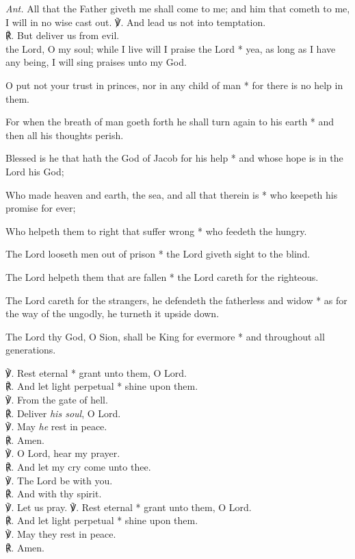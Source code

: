\textit{Ant.} All that the Father giveth me shall come to me; and him that cometh to me, I will in no wise cast out.
℣. And lead us not into temptation.\\
℟. But deliver us from evil.\\
 the Lord, O my soul; while I live will I praise the Lord * yea, as long as I have any being, I will sing praises unto my God.
\par
O put not your trust in princes, nor in any child of man * for there is no help in them.
\par
For when the breath of man goeth forth he shall turn again to his earth * and then all his thoughts perish.
\par
Blessed is he that hath the God of Jacob for his help * and whose hope is in the Lord his God;
\par
Who made heaven and earth, the sea, and all that therein is * who keepeth his promise for ever;
\par
Who helpeth them to right that suffer wrong * who feedeth the hungry.
\par
The Lord looseth men out of prison * the Lord giveth sight to the blind.
\par
The Lord helpeth them that are fallen * the Lord careth for the righteous.
\par
The Lord careth for the strangers, he defendeth the fatherless and widow * as for the way of the ungodly, he turneth it upside down.
\par
The Lord thy God, O Sion, shall be King for evermore * and throughout all generations.\\
\par\noindent
℣. Rest eternal * grant unto them, O Lord.\\
℟. And let light perpetual * shine upon them.\\
℣. From the gate of hell.\\
℟. Deliver \textit{his soul}, O Lord.\\
℣. May \textit{he} rest in peace.\\
℟. Amen.\\
℣. O Lord, hear my prayer.\\
℟. And let my cry come unto thee.\\
℣. The Lord be with you.\\
℟. And with thy spirit.\\
℣. Let us pray.
℣. Rest eternal * grant unto them, O Lord.\\
℟. And let light perpetual * shine upon them.\\
℣. May they rest in peace.\\
℟. Amen.